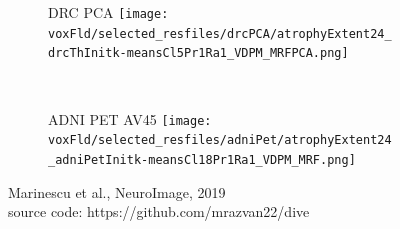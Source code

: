 \documentclass[8pt,xcolor=table]{beamer}
\begin{document}
\begin{frame}
\begin{figure}[h]
  \begin{subfigure}[b]{0.25 \textwidth}
   \centering
   \Large{DRC PCA}
  \texttt{[image: \\voxFld/selected\_resfiles/drcPCA/atrophyExtent24\_drcThInitk-meansCl5Pr1Ra1\_VDPM\_MRFPCA.png]}
  \end{subfigure}
  ~
  \begin{subfigure}[b]{0.25 \textwidth}
   \centering
   \Large{ADNI PET AV45}
  \texttt{[image: \\voxFld/selected\_resfiles/adniPet/atrophyExtent24\_adniPetInitk-meansCl18Pr1Ra1\_VDPM\_MRF.png]}
  \end{subfigure}
  
  \small{Marinescu et al., NeuroImage, 2019}\\
  \small{source code: https://github.com/mrazvan22/dive}

\end{figure}


\end{frame}
\end{document}
